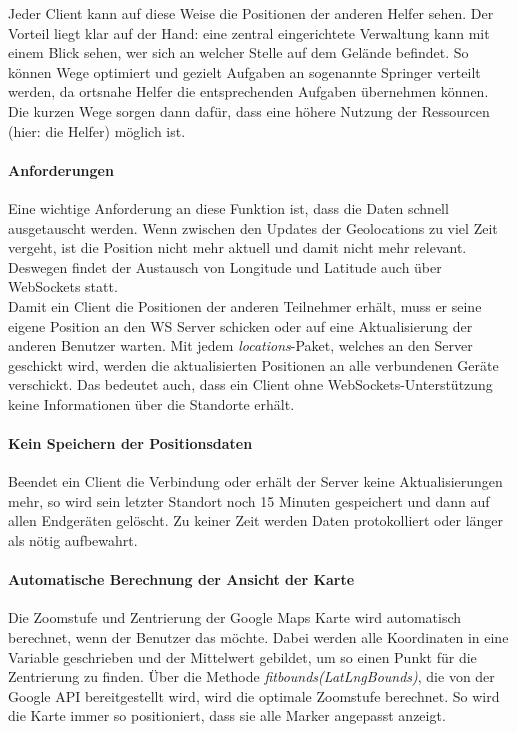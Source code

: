 Jeder Client kann auf diese Weise die Positionen der anderen Helfer sehen. Der Vorteil liegt klar auf der Hand: eine zentral eingerichtete Verwaltung kann mit einem Blick sehen, wer sich an welcher Stelle auf dem Gelände befindet. So können Wege optimiert und gezielt Aufgaben an sogenannte Springer verteilt werden, da ortsnahe Helfer die entsprechenden Aufgaben übernehmen können. Die kurzen Wege sorgen dann dafür, dass eine höhere Nutzung der Ressourcen (hier: die Helfer) möglich ist.\par

\paragraph{Anforderungen}
Eine wichtige Anforderung an diese Funktion ist, dass die Daten schnell ausgetauscht werden. Wenn zwischen den Updates der Geolocations zu viel Zeit vergeht, ist die Position nicht mehr aktuell und damit nicht mehr relevant. Deswegen findet der Austausch von Longitude und Latitude auch über WebSockets statt.\\
Damit ein Client die Positionen der anderen Teilnehmer erhält, muss er seine eigene Position an den WS Server schicken oder auf eine Aktualisierung der anderen Benutzer warten. Mit jedem \emph{locations}-Paket, welches an den Server geschickt wird, werden die aktualisierten Positionen an alle verbundenen Geräte verschickt. Das bedeutet auch, dass ein Client ohne WebSockets-Unterstützung keine Informationen über die Standorte erhält.

\paragraph{Kein Speichern der Positionsdaten}
Beendet ein Client die Verbindung oder erhält der Server keine Aktualisierungen mehr, so wird sein letzter Standort noch 15 Minuten gespeichert und dann auf allen Endgeräten gelöscht. Zu keiner Zeit werden Daten protokolliert oder länger als nötig aufbewahrt.

\paragraph{Automatische Berechnung der Ansicht der Karte}
Die Zoomstufe und Zentrierung der Google Maps Karte wird automatisch berechnet, wenn der Benutzer das möchte. Dabei werden alle Koordinaten in eine Variable geschrieben und der Mittelwert gebildet, um so einen Punkt für die Zentrierung zu finden. Über die Methode \emph{fitbounds(LatLngBounds)}, die von der Google API bereitgestellt wird, wird die optimale Zoomstufe berechnet. So wird die Karte immer so positioniert, dass sie alle Marker angepasst anzeigt.

